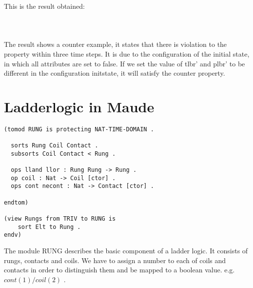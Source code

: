 \documentclass{article}
\begin{document}
This is the result obtained:\\\\
    \\\\
    The result shows a counter example, it states that there is violation to the property within three time steps. It is due to the configuration of the initial state, in which all attributes are set to false. If we set the value of tlbr' and plbr' to be different in the configuration initstate, it will satisfy the counter property.
\newpage
\section{Ladderlogic in Maude}
\begin{verbatim}
(tomod RUNG is protecting NAT-TIME-DOMAIN .
  
  sorts Rung Coil Contact .
  subsorts Coil Contact < Rung .

  ops lland llor : Rung Rung -> Rung .
  op coil : Nat -> Coil [ctor] .
  ops cont necont : Nat -> Contact [ctor] .

endtom)

(view Rungs from TRIV to RUNG is
    sort Elt to Rung .
endv)
\end{verbatim}

The module RUNG describes the basic component of a ladder logic. It consists of rungs, contacts and coils. We have to assign a number to each of coils and contacts in order to distinguish them and be mapped to a boolean value. e.g. $cont(1) / coil(2)$ .
\end{document}
